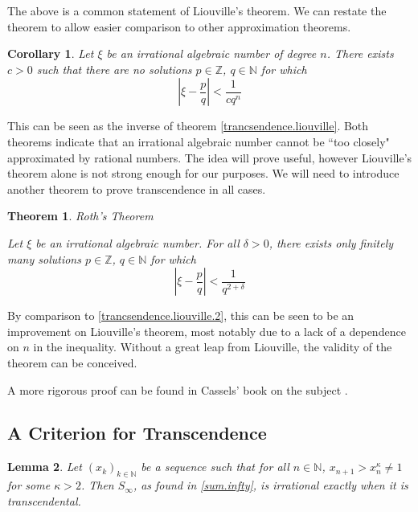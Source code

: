 \documentclass{article}
\newtheorem{theorem}{Theorem}[section]
\newtheorem{corollary}{Corollary}[theorem]
\newtheorem{lemma}[theorem]{Lemma}
\theoremstyle{remark}
\theoremstyle{definition}
\begin{document}
The above is a common statement of Liouville's theorem. We can restate the theorem to allow easier comparison to other approximation theorems.
\begin{corollary}\label{trancsendence.liouville.corollary}
    Let $\xi$ be an irrational algebraic number of degree $n$. There exists $c>0$ such that there are no solutions $p \in \mathbb{Z}$, $q \in \mathbb{N}$ for which
    \begin{equation}\label{trancsendence.liouville.2}
        \left| \xi - \frac{p}{q} \right| < \frac{1}{c q^n}
    \end{equation}
\end{corollary}
This can be seen as the inverse of theorem \ref{trancsendence.liouville}. Both theorems indicate that an irrational algebraic number cannot be ``too closely" approximated by rational numbers. The idea will prove useful, however Liouville's theorem alone is not strong enough for our purposes. We will need to introduce another theorem to prove transcendence in all cases.
\begin{theorem}{Roth's Theorem}\label{trancsendence.roth}

    Let $\xi$ be an irrational algebraic number. For all $\delta>0$, there exists only finitely many solutions $p \in \mathbb{Z}$, $q \in \mathbb{N}$ for which
    \begin{equation}
        \left| \xi - \frac{p}{q} \right| < \frac{1}{q^{2+\delta}}
    \end{equation}
\end{theorem}

By comparison to \eqref{trancsendence.liouville.2}, this can be seen to be an improvement on Liouville's theorem, most notably due to a lack of a dependence on $n$ in the inequality. Without a great leap from Liouville, the validity of the theorem can be conceived.

A more rigorous proof can be found in Cassels' book on the subject \cite{cassels1957introduction}.

\subsection{A Criterion for Transcendence}

\begin{lemma}\label{trancsendence.criterion}
Let $(x_k)_{k\in\mathbb{N}}$ be a sequence such that for all $n \in \mathbb{N}$, $x_{n+1} > x_n^\kappa \neq 1$ for some $\kappa > 2$. Then $S_\infty$, as found in \eqref{sum.infty}, is irrational exactly when it is transcendental.
\end{lemma}
\end{document}
